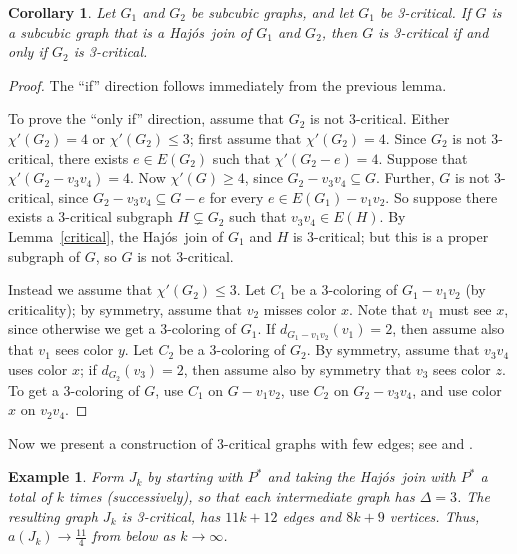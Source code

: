 \documentclass[12pt]{article}
\theoremstyle{plain}
\newtheorem{cor}[prop]{Corollary}
\newtheorem{example}{Example}
\theoremstyle{definition}
\theoremstyle{remark}
\def\hajos{Haj\'{o}s}
\begin{document}
%
%
%
\begin{cor}
Let $G_1$ and $G_2$ be subcubic graphs, and let $G_1$ be 3-critical.  If $G$ is
a subcubic graph that is a \hajos\ join of $G_1$ and $G_2$, then $G$ is
3-critical if and only if $G_2$ is 3-critical.
\label{hajos-cor}
\end{cor}
\begin{proof}
The ``if'' direction follows immediately from the previous lemma.

To prove the ``only if'' direction, assume that $G_2$ is not 3-critical. Either
$\chi'(G_2)=4$ or $\chi'(G_2)\le 3$;
first assume that $\chi'(G_2)=4$.  Since $G_2$ is not 3-critical,
there exists $e\in E(G_2)$ such that $\chi'(G_2-e)=4$.
Suppose that $\chi'(G_2-v_3v_4)=4$.  Now $\chi'(G)\ge 4$, since
$G_2-v_3v_4\subseteq G$.  Further, $G$ is not 3-critical, since
$G_2-v_3v_4\subseteq G-e$ for every $e\in E(G_1)-v_1v_2$.  So suppose
there exists a 3-critical subgraph $H\subsetneq G_2$ such that $v_3v_4\in E(H)$.
By Lemma~\ref{critical}, the \hajos\ join of $G_1$ and $H$ is 3-critical; but
this is a proper subgraph of $G$, so $G$ is not 3-critical.

Instead we assume that $\chi'(G_2)\le3$.
Let $C_1$ be a 3-coloring of $G_1-v_1v_2$ (by criticality); by symmetry, assume
that $v_2$ misses color $x$.  Note that $v_1$ must see $x$, since
otherwise we get a 3-coloring of $G_1$.  If $d_{G_1-v_1v_2}(v_1)=2$, then assume
also that $v_1$ sees color $y$.
Let $C_2$ be a 3-coloring of $G_2$. By symmetry, assume that $v_3v_4$ uses color
$x$; if $d_{G_2}(v_3)=2$, then assume also by symmetry that $v_3$ sees color
$z$.  To get a 3-coloring of $G$, use $C_1$ on $G-v_1v_2$, use $C_2$ on
$G_2-v_3v_4$, and use color $x$ on $v_2v_4$.
\end{proof}

Now we present a construction of 3-critical graphs with few edges; see
\cite[p.~43]{FioriniWilson} and \cite[p.~815]{Woodall08}.

\begin{example}
Form $J_k$ by starting with $P^*$ and taking the \hajos\ join
with $P^*$ a total of $k$ times (successively), so that each intermediate graph
has $\Delta=3$.  The resulting graph $J_k$ is 3-critical, has $11k+12$ edges and
$8k+9$ vertices.  Thus, $a(J_k)\to \frac{11}4$ from below as $k\to \infty$.
\label{example1}
\end{example}
\end{document}
